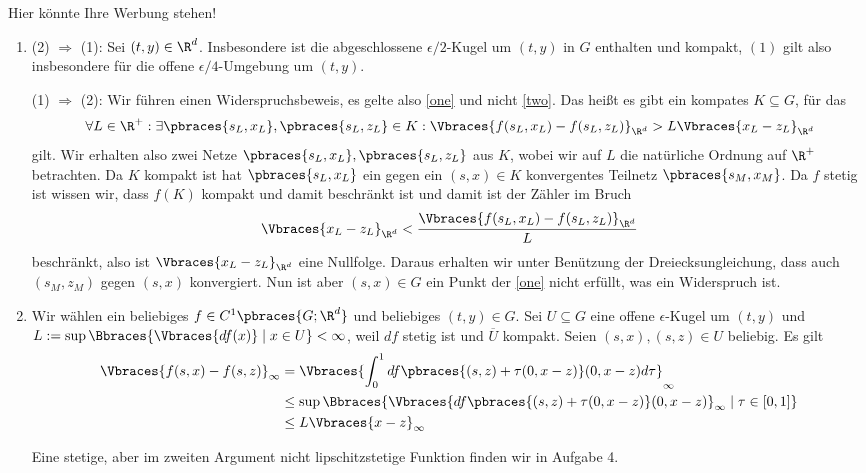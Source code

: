 \begin{solution}
  Hier könnte Ihre Werbung stehen!

  \begin{enumerate}[label = \alph*)]
    \item 
    (2) $\Rightarrow$ (1): Sei $(t, y) \in \R^d$.
    Insbesondere ist die abgeschlossene $\epsilon /2$-Kugel um $(t,y)$ in $G$ enthalten und kompakt, $(1)$ gilt also insbesondere für die offene $\epsilon /4$-Umgebung um $(t,y)$.

    (1) $\Rightarrow$ (2):
    Wir führen einen Widerspruchsbeweis, es gelte also \ref{one} und nicht \ref{two}. Das heißt es gibt ein kompates $K \subseteq G$, für das 
    \begin{align*}
      \forall L \in \R^+: \exists \pbraces{s_L,x_L}, \pbraces{s_L, z_L} \in K: \Vbraces{f(s_L,x_L) - f(s_L,z_L)}_{\R^d} > L \Vbraces{x_L - z_L}_{\R^d}
    \end{align*}
    gilt. Wir erhalten also zwei Netze $\pbraces{s_L,x_L}, \pbraces{s_L, z_L}$ aus $K$, wobei wir auf $L$ die natürliche Ordnung auf $\R^+$ betrachten. Da $K$ kompakt ist hat $\pbraces{s_L,x_L}$ ein gegen ein $(s,x) \in K$ konvergentes Teilnetz $\pbraces{s_M, x_M}$. Da $f$ stetig ist wissen wir, dass $f(K)$ kompakt und damit beschränkt ist und damit ist der Zähler im Bruch
    \begin{align*}
      \Vbraces{x_L - z_L}_{\R^d} < \frac{\Vbraces{f(s_L,x_L) - f(s_L,z_L)}_{\R^d}}{L}
    \end{align*}
    beschränkt, also ist $\Vbraces{x_L - z_L}_{\R^d}$ eine Nullfolge. Daraus erhalten wir unter Benützung der Dreiecksungleichung, dass auch $(s_M,z_M)$ gegen $(s,x)$ konvergiert. Nun ist aber $(s,x) \in G$ ein Punkt der \ref{one} nicht erfüllt, was ein Widerspruch ist.

    \item Wir wählen ein beliebiges $f \in C^1\pbraces{G; \R^d}$ und beliebiges $(t,y) \in G$. Sei $U \subseteq G$ eine offene $\epsilon$-Kugel um $(t,y)$ und $L := \sup\Bbraces{\Vbraces{df(x)} \mid x \in U } < \infty$, weil $df$ stetig ist und $\overline{U}$ kompakt. Seien $(s,x), (s,z) \in U$ beliebig. Es gilt
    \begin{align*}
      \Vbraces{f(s,x) - f(s,z)}_\infty &= \Vbraces{\int_0^1 df\pbraces{(s,z) + \tau (0, x - z)} (0, x - z) d\tau }_\infty \\
      &\leq \sup\Bbraces{ \Vbraces{df\pbraces{(s,z) + \tau (0, x - z)} (0, x - z)}_\infty \mid \tau \in [0,1] } \\
      &\leq L \Vbraces{x - z}_\infty
    \end{align*} 

    Eine stetige, aber im zweiten Argument nicht lipschitzstetige Funktion finden wir in Aufgabe 4.
  \end{enumerate}

\end{solution}
